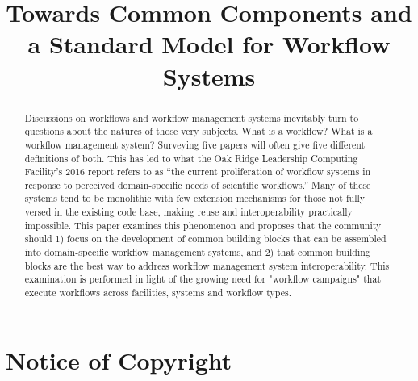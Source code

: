 \documentclass[conference]{IEEEtran}
\begin{document}
\title{Towards Common Components and a Standard Model for Workflow Systems}


\author{  \and {}  }

\maketitle

\begin{abstract} 

Discussions on workflows and workflow management systems inevitably turn to
questions about the natures of those very subjects. What is a workflow? What is
a workflow management system? Surveying five papers will often give five
different definitions of both. This has led to what the Oak Ridge Leadership
Computing Facility’s 2016 report refers to as “the current proliferation of
workflow systems in response to perceived domain-specific needs of scientific
workflows.” Many of these systems tend to be monolithic with few extension
mechanisms for those not fully versed in the existing code base, making reuse
and interoperability practically impossible. This paper examines this phenomenon
and proposes that the community should 1) focus on the development of common
building blocks that can be assembled into domain-specific workflow management
systems, and 2) that common building blocks are the best way to address workflow
management system interoperability. This examination is performed in light of
the growing need for "workflow campaigns" that execute workflows across
facilities, systems and workflow types.

\end{abstract}

\section{Notice of Copyright}\label{notice-of-copyright}
\end{document}
